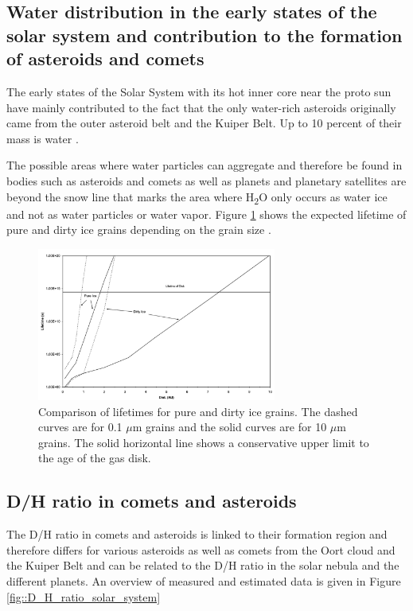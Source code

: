 \subsection{Water distribution in the early states of the solar system and contribution to the formation of asteroids and comets}

The early states of the Solar System with its hot inner core near the proto sun have mainly contributed to the fact that the only water-rich asteroids originally came from the outer asteroid belt and the Kuiper Belt. Up to 10 percent of their mass is water \cite{morbidelli2000source}. 

The possible areas where water particles can aggregate and therefore be found in bodies such as asteroids and comets as well as planets and planetary satellites are beyond the snow line that marks the area where H\textsubscript{2}O only occurs as water ice and not as water particles or water vapor. Figure \ref{fig::lifetimes_ice_grains} shows the expected lifetime of pure and dirty ice grains depending on the grain size \cite{snow_line_age}.

\begin{figure}
	\centering
	\includegraphics[width=0.7\textwidth]{figures/lifetime_water_ice}
	\caption{Comparison of lifetimes for pure and dirty ice grains. The dashed curves are for 0.1 $\mu$m grains and the solid curves are for 10 $\mu$m grains. The solid horizontal line shows a conservative upper limit to the age of the gas disk.  \cite{snow_line_age}}
	\label{fig::lifetimes_ice_grains}
\end{figure}


\subsection{D/H ratio in comets and asteroids}

The D/H ratio in comets and asteroids is linked to their formation region and therefore differs for various asteroids as well as comets from the Oort cloud and the Kuiper Belt and can be related to the D/H ratio in the solar nebula and the different planets. 
An overview of measured and estimated data is given in Figure \ref{fig::D_H_ratio_solar_system}

